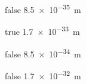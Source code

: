             \begin{reponses}
                \item[false] \SI{8,5e-35}{\meter}
                \item[true] \SI{1,7 e-33}{\meter}
                \item[false] \SI{8,5e-34}{\meter}
                \item[false] \SI{1,7e-32}{\meter}
            \end{reponses}
